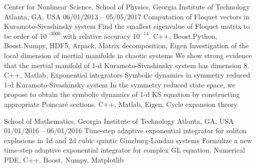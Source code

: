 


\begin{cventries}
  \cvresearch
  {Center for Nonlinear Science, School of Physics, Georgia Institute of Technology}
  {Atlanta, GA, USA}
  {06/01/2013 -- 05/05/2017}
  {
    \cvresearchitem
    {Computation of Floquet vectors in Kuramoto-Sivashinsky system}
    {Find the smallest eigenvalue of Floquet matrix to be order of $10^{-3000}$ with relative accuracy $10^{-14}$.}
    {C++, Boost.Python, Boost.Numpy, HDF5, Arpack, Matrix decomposition, Eigen}
    \cvresearchitem
    {Investigation of the local dimension of inertial manifolds in chaotic systems}
    {We show strong evidence that the inertial manifold of 1-d Kuramoto-Sivashinsky system has dimension 8.}
    {C++, Matlab, Exponential integrators}
    \cvresearchitem
    {Symbolic dynamics in symmetry reduced 1-d Kuramoto-Sivashinsky system}
    {In the symmetry reduced state space, we propose to obtain the symbolic dynamics of 1-d KS equation by constructing appropriate Poincar\'e sections.}
    {C++, Matlab, Eigen, Cycle expansion theory}
  }

  \cvresearch
  {School of Mathematics, Georgia Institute of Technology} 
  {Atlanta, GA, USA}
  {01/01/2016 -- 06/01/2016} 
  {
    \cvresearchitem
    {Time-step adaptive exponential integrator for soliton explosions in 1d and 2d cubic quintic Ginzburg-Landau systems}
    {Formulize a new time-step adaptive exponential integrator for complex GL equation.}
    {Numerical PDE, C++, Boost, Numpy, Matplotlib}
  }


\end{cventries}
